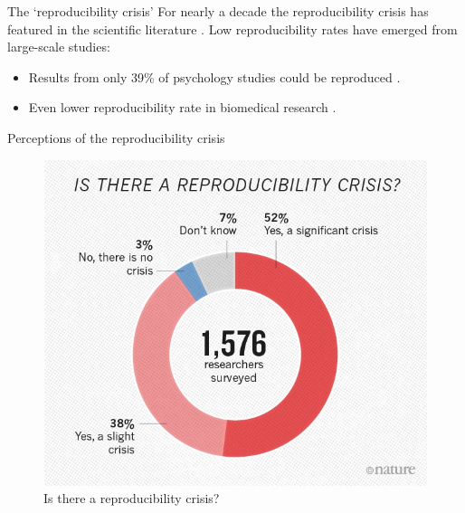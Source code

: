 \documentclass[aspectratio=169, 11pt]{beamer} %
\begin{document}
\begin{frame}{The `reproducibility crisis'}
  For nearly a decade the reproducibility crisis has featured in the scientific literature \cite{Jasny2011-bw, Baker2016-cf, Munafo2017-bj}. Low reproducibility rates have emerged from large-scale studies:
    \begin{itemize}[label=\textbullet]
        \item Results from only 39\% of psychology studies could be reproduced \cite{Open_Science_Collaboration2015-vf}.
        \item Even lower reproducibility rate in biomedical research \cite{Begley2012-xt,Prinz2011-za}.
    \end{itemize}
\end{frame}

\begin{frame}{Perceptions of the reproducibility crisis}
  \begin{figure}[H]
    \centering
        \includegraphics[height=.7\textheight]{figures/reproducibility-graphic-online1.jpeg}
        \caption{Is there a reproducibility crisis? \cite{Baker2016-cf}}
        \label{fig:Baker2016}
  \end{figure}
\end{frame}
\end{document}

